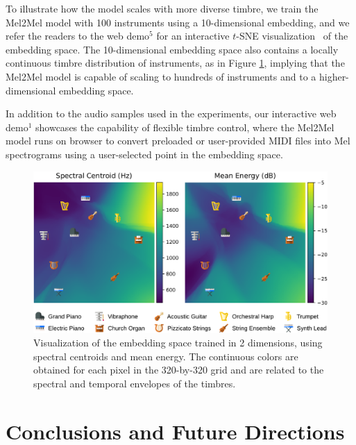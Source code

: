 To illustrate how the model scales with more diverse timbre, we train the Mel2Mel model with 100 instruments using a 10-dimensional embedding, and we refer the readers to the web demo$^\textrm{5}$ for an interactive $t$-SNE visualization~\cite{maaten2008visualizing} of the embedding space.
The 10-dimensional embedding space also contains a locally continuous timbre distribution of instruments, as in Figure \ref{fig:embedding}, implying that the Mel2Mel model is capable of scaling to hundreds of instruments and to a higher-dimensional embedding space.

In addition to the audio samples used in the experiments, our interactive web demo$^\textrm{1}$ %
showcases the capability of flexible timbre control, where the Mel2Mel model runs on browser to convert preloaded or user-provided MIDI files into Mel spectrograms using a user-selected point in the embedding space.

\begin{figure}[t]
	\centering
	\includegraphics[width=\columnwidth]{runpixels.pdf}
	\caption{Visualization of the embedding space trained in 2 dimensions, using spectral centroids and mean energy. The continuous colors are obtained for each pixel in the 320-by-320 grid and are related to the spectral and temporal envelopes of the timbres.}
	\label{fig:embedding}
	\vspace{-1em}
\end{figure}


\section{Conclusions and Future Directions}\label{sec:conclusions}

